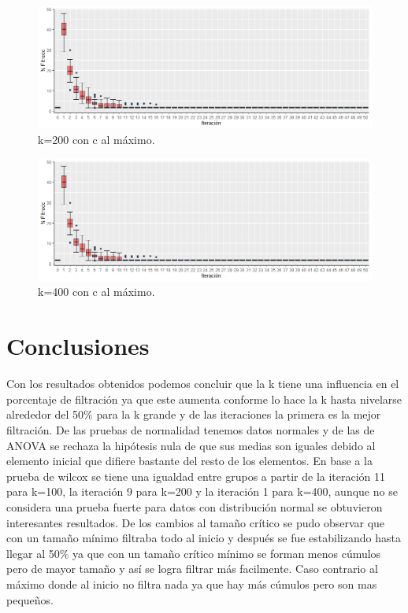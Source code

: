 \documentclass{article}
\begin{document}
\begin{figure} [h!]%
\renewcommand{\figurename}{Gráfica}
    \centering
    \caption{ k=200 con c al máximo.}
    \label{grafica10}
    \includegraphics[width=170mm]{grafica10.png} %
\end{figure}

\begin{figure} [h!]%
\renewcommand{\figurename}{Gráfica}
    \centering
    \caption{ k=400 con c al máximo.}
    \label{grafica11}
    \includegraphics[width=170mm]{grafica11.png} %
\end{figure}

\section{Conclusiones}
Con los resultados obtenidos podemos concluir que la k tiene una influencia en el porcentaje de filtración ya que este aumenta conforme lo hace la k hasta nivelarse alrededor del 50\% para la k grande y de las iteraciones la primera es la mejor filtración. De las pruebas de normalidad tenemos datos normales y de las de ANOVA se rechaza la hipótesis nula de que sus medias son iguales debido al elemento inicial que difiere bastante del resto de los elementos. En base a la prueba de wilcox se tiene una igualdad entre grupos a partir de la iteración 11 para k=100, la iteración 9 para k=200 y la iteración 1 para k=400, aunque no se considera una prueba fuerte para datos con distribución normal se obtuvieron interesantes resultados. De los cambios al tamaño crítico se pudo observar que con un tamaño mínimo filtraba todo al inicio y después se fue estabilizando hasta llegar al 50\% ya que con un tamaño crítico mínimo se forman menos cúmulos pero de mayor tamaño y así se logra filtrar más facilmente. Caso contrario al máximo donde al inicio no filtra nada ya que hay más cúmulos pero son mas pequeños.



\end{document}
